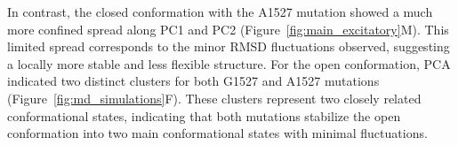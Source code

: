 In contrast, the closed conformation with the A1527 mutation showed a much more confined spread along PC1 and PC2 (Figure~\ref{fig:main_excitatory}M). This limited spread corresponds to the minor RMSD fluctuations observed, suggesting a locally more stable and less flexible structure. 
For the open conformation, PCA indicated two distinct clusters for both G1527 and A1527 mutations (Figure~\ref{fig:md_simulations}F). These clusters represent two closely related conformational states, indicating that both mutations stabilize the open conformation into two main conformational states with minimal fluctuations. 
